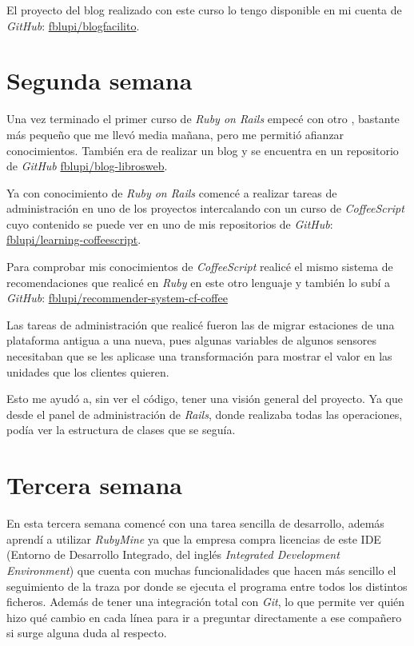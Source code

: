 El proyecto del blog realizado con este curso lo tengo disponible en mi cuenta de \textit{GitHub}: \href{https://github.com/fblupi/blogfacilito}{fblupi/blogfacilito}.

\section{Segunda semana}

Una vez terminado el primer curso de \textit{Ruby on Rails} empecé con otro \cite{librosweb-rails}, bastante más pequeño que me llevó media mañana, pero me permitió afianzar conocimientos. También era de realizar un blog y se encuentra en un repositorio de \textit{GitHub} \href{https://github.com/fblupi/blog-librosweb}{fblupi/blog-librosweb}.

Ya con conocimiento de \textit{Ruby on Rails} comencé a realizar tareas de administración en uno de los proyectos intercalando con un curso de \textit{CoffeeScript} \cite{youtube-coffee} cuyo contenido se puede ver en uno de mis repositorios de \textit{GitHub}: \href{https://github.com/fblupi/learning-coffeescript}{fblupi/learning-coffeescript}.

Para comprobar mis conocimientos de \textit{CoffeeScript} realicé el mismo sistema de recomendaciones que realicé en \textit{Ruby} en este otro lenguaje y también lo subí a \textit{GitHub}: \href{https://github.com/fblupi/recommender-system-cf-coffee}{fblupi/recommender-system-cf-coffee}

Las tareas de administración que realicé fueron las de migrar estaciones de una plataforma antigua a una nueva, pues algunas variables de algunos sensores necesitaban que se les aplicase una transformación para mostrar el valor en las unidades que los clientes quieren.

Esto me ayudó a, sin ver el código, tener una visión general del proyecto. Ya que desde el panel de administración de \textit{Rails}, donde realizaba todas las operaciones, podía ver la estructura de clases que se seguía.

\section{Tercera semana}

En esta tercera semana comencé con una tarea sencilla de desarrollo, además aprendí a utilizar \textit{RubyMine} ya que la empresa compra licencias de este IDE (Entorno de Desarrollo Integrado, del inglés \textit{Integrated Development Environment}) que cuenta con muchas funcionalidades que hacen más sencillo el seguimiento de la traza por donde se ejecuta el programa entre todos los distintos ficheros. Además de tener una integración total con \textit{Git}, lo que permite ver quién hizo qué cambio en cada línea para ir a preguntar directamente a ese compañero si surge alguna duda al respecto.

